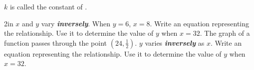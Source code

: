 \vspace{1em}
$k$ is called the constant of .




\begin{my2Problems}{2in}
    {
        $x$ and $y$ vary {\bfseries\itshape inversely}.
        When $y=6$, $x=8$.
        Write an equation representing the relationship.
        Use it to determine the value of $y$ when $x=32$.
    }
    {
        The graph of a function passes through the point 
        $(24, \frac{1}{2})$.
        $y$ varies {\bfseries\itshape inversely} as $x$.
        Write an equation representing the relationship.
        Use it to determine the value of $y$ when $x=32$.
    }
\end{my2Problems}

